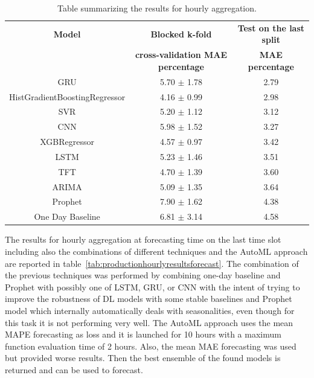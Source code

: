 \begin{table}[H]
\centering
\begin{tabular}{|c|c|c|}
\hline
\textbf{Model} & \textbf{Blocked k-fold} & \textbf{Test on the last split}\\
 & \textbf{cross-validation MAE percentage} & \textbf{MAE percentage}\\
\hline
GRU & 5.70 $\pm$ 1.78 & 2.79\\
\hline
HistGradientBoostingRegressor & 4.16 $\pm$ 0.99 & 2.98\\
\hline
SVR & 5.20 $\pm$ 1.12 & 3.12\\
\hline
CNN & 5.98 $\pm$ 1.52 & 3.27\\
\hline
XGBRegressor & 4.57 $\pm$ 0.97 & 3.42\\
\hline
LSTM & 5.23 $\pm$ 1.46 & 3.51\\
\hline
TFT & 4.70 $\pm$ 1.39 & 3.60\\
\hline
ARIMA & 5.09 $\pm$ 1.35 & 3.64\\
\hline
Prophet & 7.90 $\pm$ 1.62 & 4.38\\
\hline
One Day Baseline & 6.81 $\pm$ 3.14 & 4.58\\
\hline
\end{tabular}
\caption{Table summarizing the results for hourly aggregation.}
\label{tab:productionhourlyresults}
\end{table}

The results for hourly aggregation at forecasting time on the last time slot including also the combinations of different techniques and the AutoML approach are reported in table~\ref{tab:productionhourlyresultsforecast}.
The combination of the previous techniques was performed by combining one-day baseline and Prophet with possibly one of LSTM, GRU, or CNN with the intent of trying to improve the robustness of DL models with some stable baselines and Prophet model which internally automatically deals with seasonalities, even though for this task it is not performing very well.
The AutoML approach uses the mean MAPE forecasting as loss and it is launched for 10 hours with a maximum function evaluation time of 2 hours.
Also, the mean MAE forecasting was used but provided worse results.
Then the best ensemble of the found models is returned and can be used to forecast.

